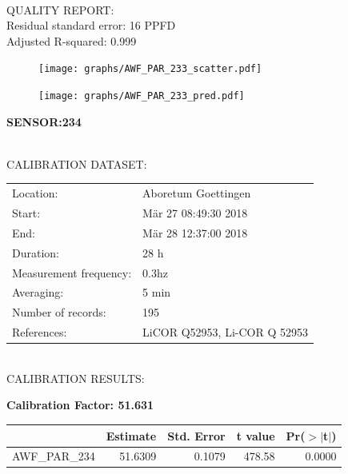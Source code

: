 \documentclass[oneside]{report}
\begin{document}
\hrulefill\\
QUALITY REPORT:\\
Residual standard error: 16 PPFD\\
Adjusted R-squared: 0.999



\begin{figure}[H]
  \centering
  \texttt{[image: graphs/AWF\_PAR\_233\_scatter.pdf]}
\end{figure}




\begin{figure}[H]
  \centering
  \texttt{[image: graphs/AWF\_PAR\_233\_pred.pdf]}
\end{figure}

\pagebreak


\begin{center}
\large{\textbf{SENSOR:234}}\\
\end{center}

\hrulefill\\
CALIBRATION DATASET:\\
\begin{table}[h!]
  \centering
  \label{tab:table1}
  \begin{tabular}{ll}
    Location: & Aboretum Goettingen\\ 
    
    
    Start:  & Mär 27 08:49:30 2018 \\
    End:   & Mär 28 12:37:00 2018\\ 
    Duration: & 28 h\\
    Measurement frequency: & 0.3hz\\
    Averaging:  &5 min\\
    Number of records: & 195 \\
    References: & LiCOR Q52953, Li-COR Q 52953 \\
  \end{tabular}
\end{table}

\hrulefill\\
CALIBRATION RESULTS:\\


\begin{center}
\textbf{\large{Calibration Factor: 51.631}}\\
\end{center}
\begin{table}[ht]
\centering
\begin{tabular}{rrrrr}
  \hline
 & Estimate & Std. Error & t value & Pr($>$$|$t$|$) \\ 
  \hline
AWF\_PAR\_234 & 51.6309 & 0.1079 & 478.58 & 0.0000 \\ 
   \hline
\end{tabular}
\end{table}
\end{document}
